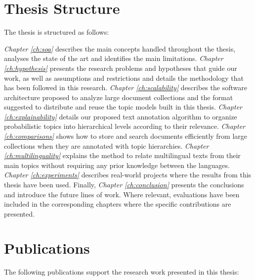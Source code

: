 \section{Thesis Structure}

The thesis is structured as follows:

\textit{Chapter \ref{ch:soa}} describes the main concepts handled throughout the thesis, analyses the state of the art and identifies the main limitations. \textit{Chapter \ref{ch:hypothesis}} presents the research problems and hypotheses that guide our work, as well as assumptions and restrictions and details the methodology that has been followed in this research. \textit{Chapter \ref{ch:scalability}} describes the software architecture proposed to analyze large document collections and the format suggested to distribute and reuse the topic models built in this thesis. \textit{Chapter \ref{ch:explainability}} details our proposed text annotation algorithm to organize probabilistic topics into hierarchical levels according to their relevance. \textit{Chapter \ref{ch:comparisons}} shows how to store and search documents efficiently from large collections when they are annotated with topic hierarchies.  \textit{Chapter \ref{ch:multilinguality}} explains the method to relate multilingual texts from their main topics without requiring any prior knowledge between the languages. \textit{Chapter \ref{ch:experiments}} describes real-world projects where the results from this thesis have been used. Finally, \textit{Chapter \ref{ch:conclusion}} presents the conclusions and introduce the future lines of work. Where relevant, evaluations have been included in the corresponding chapters where the specific contributions are presented.


\section{Publications}
\label{sec:publications}

The following publications support the research work presented in this thesis:


